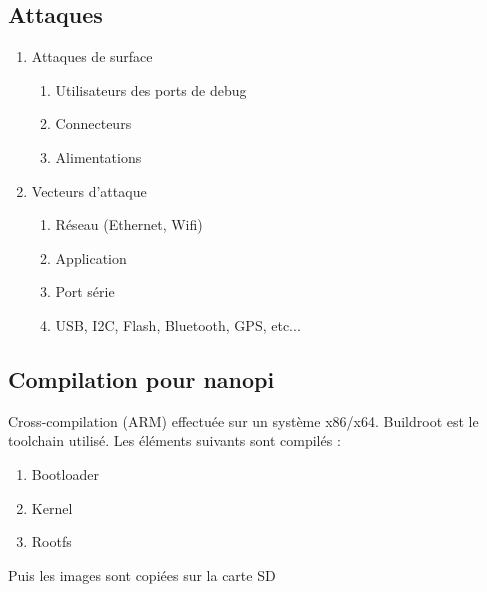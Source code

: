 \documentclass[resume]{subfiles}
\begin{document}
\subsection{Attaques}
\begin{enumerate}
\item Attaques de surface
\begin{enumerate}
\item Utilisateurs des ports de debug
\item Connecteurs
\item Alimentations
\end{enumerate}
\item Vecteurs d'attaque
\begin{enumerate}
\item Réseau (Ethernet, Wifi)
\item Application
\item Port série
\item USB, I2C, Flash, Bluetooth, GPS, etc...
\end{enumerate}
\end{enumerate}
\subsection{Compilation pour nanopi}
Cross-compilation (ARM) effectuée sur un système x86/x64. Buildroot est le toolchain utilisé. Les éléments suivants sont compilés :
\begin{enumerate}
\item Bootloader
\item Kernel
\item Rootfs
\end{enumerate}
Puis les images sont copiées sur la carte SD
\end{document}
